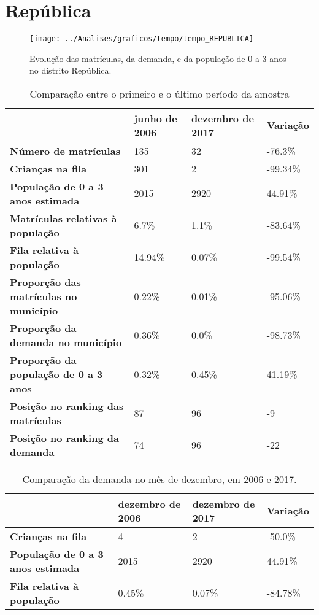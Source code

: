 \section{República}
\begin{figure}[H]
\centering
\texttt{[image: ../Analises/graficos/tempo/tempo\_REPUBLICA]}
\caption{Evolução das matrículas, da demanda, e da população de 0 a 3 anos no distrito República.}
\end{figure}
\begin{table}[H]
\begin{tabular}{|l|l|l|l|}
\hline
\textbf{}                                      & \textbf{junho de 2006}       & \textbf{dezembro de 2017}    & \textbf{Variação} \\ \hline
\textbf{Número de matrículas}                  & 135 & 32 & -76.3\% \\ \hline
\textbf{Crianças na fila}                      & 301 & 2 & -99.34\% \\ \hline
\textbf{População de 0 a 3 anos estimada}      & 2015 & 2920 & 44.91\% \\ \hline
\textbf{Matrículas relativas à população}      & 6.7\% & 1.1\% & -83.64\% \\ \hline
\textbf{Fila relativa à população}             & 14.94\% & 0.07\% & -99.54\% \\ \hline
\textbf{Proporção das matrículas no município} & 0.22\% & 0.01\% & -95.06\% \\ \hline
\textbf{Proporção da demanda no município}     & 0.36\% & 0.0\% & -98.73\% \\ \hline
\textbf{Proporção da população de 0 a 3 anos}  & 0.32\% & 0.45\% & 41.19\% \\ \hline
\textbf{Posição no ranking das matrículas}     & 87 & 96 & -9 \\ \hline
\textbf{Posição no ranking da demanda}         & 74 & 96 & -22 \\ \hline
\end{tabular}
\caption{Comparação entre o primeiro e o último período da amostra}
\end{table}
\begin{table}[H]
\begin{tabular}{|l|l|l|l|}
\hline
\textbf{}                                 & \textbf{dezembro de 2006} & \textbf{dezembro de 2017} & \textbf{Variação} \\ \hline
\textbf{Crianças na fila}                      & 4 & 2 & -50.0\% \\ \hline
\textbf{População de 0 a 3 anos estimada}      & 2015 & 2920 & 44.91\% \\ \hline
\textbf{Fila relativa à população}             & 0.45\% & 0.07\% & -84.78\% \\ \hline
\end{tabular}
\caption{Comparação da demanda no mês de dezembro, em 2006 e 2017.}
\end{table}
